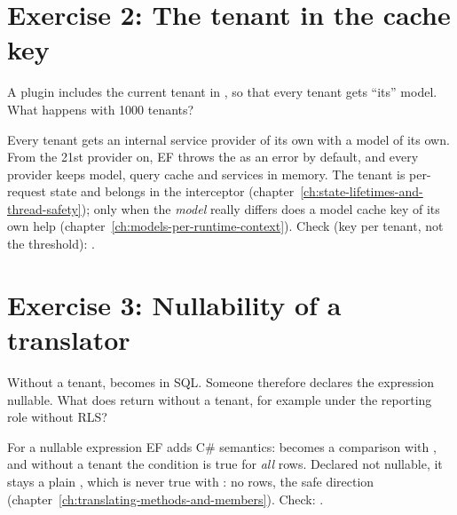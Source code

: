 \section{Exercise 2: The tenant in the cache key}

A plugin includes the current tenant in
, so that
every tenant gets “its” model. What happens with 1000 tenants?

\begin{note}[Solution]
  Every tenant gets an internal service provider of its own with a model of its own. From the
  21st provider on, EF throws the
   as
  an error by default, and every provider keeps model, query cache and services in memory. The
  tenant is per-request state and belongs in the interceptor
  (chapter~\ref{ch:state-lifetimes-and-thread-safety}); only when the \emph{model} really
  differs does a model cache key of its own help (chapter~\ref{ch:models-per-runtime-context}).
  Check (key per tenant, not the threshold): .
\end{note}

\section{Exercise 3: Nullability of a translator}

Without a tenant,  becomes  in SQL.
Someone therefore declares the expression nullable. What does
return without a tenant, for example under the reporting role without RLS?

\begin{note}[Solution]
  For a nullable expression EF adds C\# semantics: \code{<>} becomes a comparison with
  , and without a tenant the condition is
  true for \emph{all} rows. Declared not nullable, it stays a plain \code{<>}, which is never true
  with : no rows, the safe direction
  (chapter~\ref{ch:translating-methods-and-members}).
  Check: .
\end{note}

